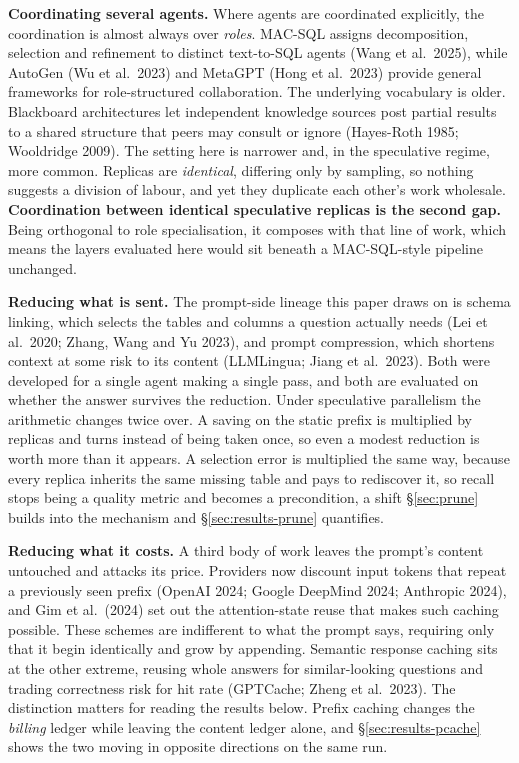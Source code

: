 \documentclass[conference]{IEEEtran}
\begin{document}
\textbf{Coordinating several agents.} Where agents are coordinated explicitly,
the coordination is almost always over \emph{roles}. MAC-SQL assigns
decomposition, selection and refinement to distinct text-to-SQL agents (Wang et
al.~2025), while AutoGen (Wu et al.~2023) and MetaGPT (Hong et al.~2023)
provide general frameworks for role-structured collaboration. The underlying
vocabulary is older. Blackboard architectures let independent knowledge sources
post partial results to a shared structure that peers may consult or ignore
(Hayes-Roth 1985; Wooldridge 2009). The setting here is narrower and, in the
speculative regime, more common. Replicas are \emph{identical}, differing only
by sampling, so nothing suggests a division of labour, and yet they duplicate
each other's work wholesale. \textbf{Coordination between identical
speculative replicas is the second gap.} Being orthogonal to role
specialisation, it composes with that line of work, which means the layers
evaluated here would sit beneath a MAC-SQL-style pipeline unchanged.

\textbf{Reducing what is sent.} The prompt-side lineage this paper draws on is
schema linking, which selects the tables and columns a question actually needs
(Lei et al.~2020; Zhang, Wang and Yu 2023), and prompt compression, which
shortens context at some risk to its content (LLMLingua; Jiang et al.~2023).
Both were developed for a single agent making a single pass, and both are
evaluated on whether the answer survives the reduction. Under speculative
parallelism the arithmetic changes twice over. A saving on the static prefix is
multiplied by replicas and turns instead of being taken once, so even a modest
reduction is worth more than it appears. A selection error is multiplied the same way, because every replica inherits
the same missing table and pays to rediscover it, so recall stops being a
quality metric and becomes a precondition, a shift §\ref{sec:prune} builds into
the mechanism and §\ref{sec:results-prune} quantifies.

\textbf{Reducing what it costs.} A third body of work leaves the prompt's
content untouched and attacks its price. Providers now discount input tokens
that repeat a previously seen prefix (OpenAI 2024; Google DeepMind 2024;
Anthropic 2024), and Gim et al.~(2024) set out the attention-state reuse that
makes such caching possible. These schemes are indifferent to what the prompt
says, requiring only that it begin identically and grow by appending. Semantic
response caching sits at the other extreme, reusing whole answers for
similar-looking questions and trading correctness risk for hit rate (GPTCache;
Zheng et al.~2023). The distinction matters for reading the results below.
Prefix caching changes the \emph{billing} ledger while leaving the content
ledger alone, and §\ref{sec:results-pcache} shows the two moving in opposite
directions on the same run.
\end{document}
